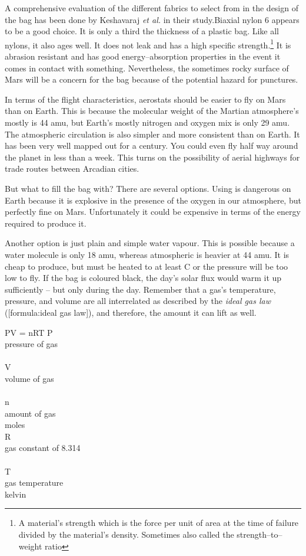A comprehensive evaluation of the different fabrics to select from in the design of the bag has been done by Keshavaraj {\it et al.} in their study.\footnotecite[keshavaraj1996] Biaxial nylon 6 appears to be a good choice. It is only a third the thickness of a plastic bag. Like all nylons, it also ages well. It does not leak and has a high specific strength.\footnote{A material's strength which is the force per unit of area at the time of failure divided by the material's density. Sometimes also called the strength--to--weight ratio} It is abrasion resistant and has good energy--absorption properties in the event it comes in contact with something. Nevertheless, the sometimes rocky surface of Mars will be a concern for the bag because of the potential hazard for punctures.

In terms of the flight characteristics, aerostats should be easier to fly on Mars than on Earth. This is because the molecular weight of the Martian atmosphere's mostly  is 44 amu, but Earth's mostly nitrogen and oxygen mix is only 29 amu. The atmospheric circulation is also simpler and more consistent than on Earth. It has been very well mapped out for a century. You could even fly half way around the planet in less than a week. This turns on the possibility of aerial highways for trade routes between Arcadian cities.

But what to fill the bag with? There are several options. Using  is dangerous on Earth because it is explosive in the presence of the oxygen in our atmosphere, but perfectly fine on Mars. Unfortunately it could be expensive in terms of the energy required to produce it. 

Another option is just plain and simple  water vapour. This is possible because a water molecule is only 18 amu, whereas atmospheric  is heavier at 44 amu. It is cheap to produce, but must be heated to at least C or the pressure will be too low to fly. If the bag is coloured black, the day's solar flux would warm it up sufficiently -- but only during the day. Remember that a gas's temperature, pressure, and volume are all interrelated as described by the {\it ideal gas law} ([formula:ideal gas law]), and therefore, the amount it can lift as well.

\crlf
{}
\startformula
PV = nRT
\stopformula
\startlegend
\leg P \\ pressure of gas \\ \\
\leg V \\ volume of gas \\ \\
\leg n \\ amount of gas \\ moles \\
\leg R \\ gas constant of 8.314 \\  \\
\leg T \\ gas temperature \\ kelvin \\
\stoplegend
\crlf

